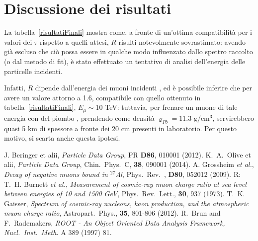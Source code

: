 \documentclass[10pt, oneside, a4paper]{article}   	%
\renewcommand{\rho}{\varrho}				%
\begin{document}
\section{Discussione dei risultati}

La tabella~\ref{risultatiFinali} mostra come, a fronte di un'ottima compatibilità per i valori dei $\tau$ rispetto a quelli attesi, $R$ risulti notevolmente sovrastimato: avendo già escluso che ciò possa essere in qualche modo influenzato dallo spettro raccolto (o dal metodo di fit), è stato effettuato un tentativo di analisi dell'energia delle particelle incidenti.

Infatti, $R$ dipende dall'energia dei muoni incidenti \cite{pb}, ed è possibile inferire che per avere un valore attorno a 1.6, compatibile con quello ottenuto in tabella~\ref{risultatiFinali}, $E_{\mu} \sim 10$ TeV: tuttavia, per frenare un muone di tale energia con del piombo \cite{pdg}, prendendo come densità $ \rho_{Pb} = 11.3 $ g/cm$^3$, servirebbero quasi 5 km di spessore a fronte dei 20 cm presenti in laboratorio. Per questo motivo, si scarta anche questa ipotesi. %

\appendix


%
\begin{thebibliography}{4}
%
J. Beringer et alii, \emph{Particle Data Group}, PR \textbf{D86}, 010001 (2012).
%
K.~A.~Olive et alii, \emph{Particle Data Group}, Chin.~Phys.~C, \textbf{38}, 090001 (2014).
%
A. Grossheim \emph{et al.}, \emph{Decay of negative muons bound in $^{27}$Al}, Phys.~Rev.~, \textbf{D80}, 052012 (2009). 
%
 R: T.~H. Burnett \emph{et al.}, \emph{Measurement of cosmic-ray muon charge ratio at sea level between energies of 10 and 1500 GeV}, Phys.~Rev.~Lett., \textbf{30}, 937 (1973).
%
T.~K. Gaisser, \emph{Spectrum of cosmic-ray nucleons, kaon production, and the atmospheric muon charge ratio}, Astropart.~Phys., \textbf{35}, 801-806 (2012).
%
R.~Brun and F.~Rademakers, \emph{ROOT - An Object Oriented Data Analysis Framework, Nucl.~Inst.~Meth.} A 389 (1997) 81.
%
\end{thebibliography}
\end{document}
